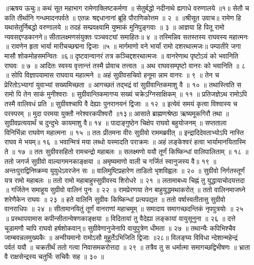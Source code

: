 ॥ऋषय ऊचुः॥
कथं सूत महाभाग रामेणाक्लिष्टकर्मणा ॥
सेतुर्बद्धो नदीनाथे ह्यगाधे वरुणालये ॥१॥
सेतौ च कति तीर्थानि गन्धमादनपर्वते ॥
एतन्नः श्रद्दधानानां ब्रूहि पौराणिकोत्तम ॥ २ ॥
॥श्रीसूत उवाच॥
रामेण हि यथासेतुर्निबद्धो वरुणालये ॥
तदहं सम्प्रवक्ष्यामि युष्माकं मुनिपुङ्गवाः ॥ ३ ॥
आज्ञया हि पितू रामो न्यवसद्दण्डकानने॥
सीतालक्ष्मणसंयुक्तः पञ्चवट्यां समाहितः॥ ४ ॥
तस्मिन्निव सतस्तस्य राघवस्य महात्मनः ॥
रावणेन हृता भार्या मारीचच्छद्मना द्विजाः ॥५ ॥
मार्गमाणो वने भार्यां रामो दशरथात्मजः॥
पम्पातीरे जगा मासौ शोकमोहसमन्वितः ॥६॥
दृष्टवान्वानरं तत्र कञ्चिद्दशरथात्मजः ॥
वानरेणाथ पृष्टोऽयं को भवानिति राघवः ॥ ७ ॥
आदितः स्वस्य वृत्तान्त्तं तस्मै प्रोवाच तत्त्वतः ॥
अथ राघवसम्पृष्टो वानरः को भवानिति ॥ ८ ॥
सोपि विज्ञापयामास राघवाय महात्मने ॥
अहं सुग्रीवसचिवो हनूमा न्नाम वानरः ॥ ९ ॥
तेन च प्रेरितोऽभ्यागां युवाभ्यां सख्यमिच्छता ॥
आगच्छतं तद्भद्रं वां सुग्रीवान्तिकमाशु वै ॥ १० ॥
तथास्त्विति स रामो पि तेन साकं मुनीश्वराः ॥
सुग्रीवान्तिकमागप्य सख्यं चक्रेऽग्निसाक्षिकम् ॥ ११ ॥
प्रतिजज्ञेऽथ रामोऽपि तस्मै वालिवधं प्रति ॥
सुग्रीवश्चापि वै देह्याः पुनरानयनं द्विजाः ॥ १२ ॥
इत्येवं समयं कृत्वा विश्वास्य च परस्परम् ॥
मुदा परमया युक्तौ नरेश्वरकपीश्वरौ ॥१३॥
आसाते ब्राह्मणश्रेष्ठा ऋष्यमूकगिरौ तथा ॥
सुग्रीवप्रत्ययार्थं च दुन्दुभेः कायमाशु वै॥ १४ ॥
पादाङ्गुष्ठेन चिक्षेप राघवो बहुयोजनम् ॥
सप्तताला विनिर्भिन्ना राघवेण महात्मना ॥ १५ ॥
ततः प्रीतमना वीरः सुग्रीवो राममब्रवीत् ॥
इन्द्रादिदेवताभ्योऽपि नास्ति राघव मे भयम्॥ १६ ॥
भवान्मित्रं मया लब्धो यस्मादति पराक्रमः ॥
अहं लङ्केश्वरं हत्वा भार्यामानयितास्मि ते ॥ १७ ॥
ततः सुग्रीवसहितो रामचन्द्रो महाबलः ॥
सलक्ष्मणो ययौ तूर्णं किष्किन्धां वालिपालिताम् ॥ १८ ॥
ततो जगर्ज सुग्रीवो वाल्यागमनकाङ्क्षया ॥
अमृष्यमाणो वाली च गर्जितं स्वानुजस्य वै॥ १९ ॥
अन्तःपुराद्विनिष्क्रम्य युयुधेऽवरजेन सः ॥
वालिमुष्टिप्रहारेण ताडितो भृशविह्वलः ॥ २० ॥
सुग्रीवो निर्गतस्तूर्णं यत्र रामो महाबलः ॥
ततो रामो महाबाहुस्सुग्रीवस्य शिरोधरे ॥ २१ ॥
लतामाबध्य चिह्नं तु युद्धायाचोदयत्तदा ॥
गर्जितेन समाहूय सुग्रीवो वालिनं पुनः ॥ २२ ॥
रामप्रेरणया तेन बाहुयुद्धमथाकरोत् ॥
ततो वालिनमाजघ्ने शरेणैकेन राघवः ॥ २३ ॥
हते वालिनि सुग्रीवः किष्किन्धां प्रत्यपद्यत ॥
ततो वर्षास्वतीतासु सुग्रीवो वानराधिपः ॥ २४ ॥
सीतामानयितुं तूर्णं वानराणां महाचमूम् ॥
समादाय समागच्छदन्तिकं नृपपुत्रयोः ॥ २५ ॥
प्रस्थापयामास कपीन्सीतान्वेषणकाङ्क्षया ॥
विदितायां तु वैदेह्या लङ्कायां वायुसूनुना ॥ २६ ॥
दत्ते चूडामणौ चापि राघवो हर्षशोकवान्॥
सुग्रीवेणानुजेनापि वायुपुत्रेण धीमता ॥ २७ ॥
तथान्यैः कपिभिश्चैव जाम्बवन्नलमुख्यकैः ॥
अन्वीयमानो रामोऽसौ मुहूर्तेऽभिजिति द्विजाः ॥२८॥
विलङ्घ्य विविधा न्देशान्महेन्द्रं पर्वतं ययौ ॥
चक्रतीर्थं ततो गत्वा निवासमकरोत्तदा ॥ २९ ॥
तत्रैव तु स धर्मात्मा समागच्छद्विभीषणः ॥
भ्राता वै राक्षसेन्द्रस्य चतुर्भिः सचिवैः सह ॥ ३० ॥
